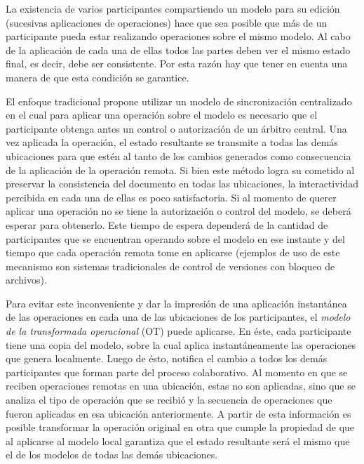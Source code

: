 \documentclass[12pt,a4paper]{article}
\begin{document}
	La existencia de varios participantes compartiendo un modelo para su edición (sucesivas aplicaciones de
	operaciones) hace que sea posible que más de un participante pueda estar realizando operaciones sobre el mismo modelo.
	Al cabo de la aplicación de cada una de ellas todos las partes deben ver el mismo estado final, es decir,
	debe ser consistente. Por esta razón hay que tener en cuenta una manera de que esta condición se garantice.

	El enfoque tradicional propone utilizar un modelo de sincronización centralizado en el cual para aplicar una
	operación sobre el modelo es necesario que el participante obtenga antes un control o autorización de un
	árbitro central. Una vez aplicada la operación, el estado resultante se transmite a todas las demás ubicaciones
	para que estén al tanto de los cambios generados como consecuencia de la aplicación de la operación remota.
	Si bien este método logra su cometido al preservar la consistencia del documento en todas las ubicaciones, la
	interactividad percibida en cada una de ellas es poco satisfactoria. Si al momento de querer aplicar una 
	operación no se tiene la autorización o control del modelo, se deberá esperar para obtenerlo. 
	Este tiempo de espera dependerá de la cantidad de participantes que se encuentran operando sobre el modelo
	en ese instante y del tiempo que cada operación remota tome en aplicarse (ejemplos de uso de este mecanismo
	son sistemas tradicionales de control de versiones con bloqueo de archivos).

	Para evitar este inconveniente y dar la impresión de una aplicación instantánea de las operaciones en cada
	una de las ubicaciones de los participantes, el \textit{modelo de la transformada operacional} (OT)
	\cite{operationaltransform} puede aplicarse. En éste, cada participante tiene una copia del modelo, sobre la
	cual aplica instantáneamente las operaciones que genera localmente. Luego de ésto, notifica el cambio a todos los demás
	participantes que forman parte del proceso colaborativo.
	Al momento en que se reciben operaciones remotas en una ubicación, estas no son aplicadas, sino que se analiza
	el tipo de operación que se recibió y la secuencia de operaciones que fueron aplicadas en esa ubicación
	anteriormente. A partir de esta información es posible transformar la operación original en otra que cumple
	la propiedad de que al aplicarse al modelo local garantiza que el estado resultante será el mismo que el de
	los modelos de todas las demás ubicaciones. \\
\end{document}
